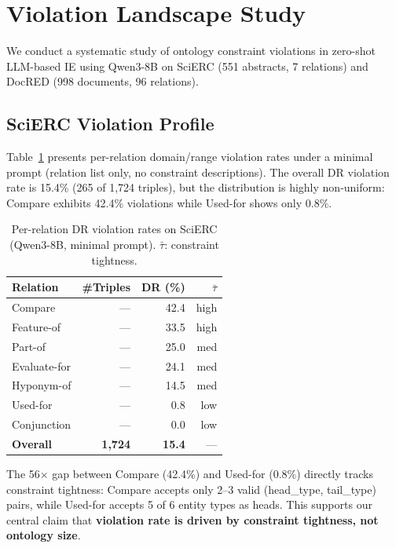 \documentclass[11pt,a4paper]{article}
\begin{document}
\section{Violation Landscape Study}
\label{sec:landscape}

We conduct a systematic study of ontology constraint violations in zero-shot LLM-based IE using Qwen3-8B on SciERC (551 abstracts, 7 relations) and DocRED (998 documents, 96 relations).

\subsection{SciERC Violation Profile}
\label{sec:scierc-violations}

Table~\ref{tab:per-relation-dr} presents per-relation domain/range violation rates under a minimal prompt (relation list only, no constraint descriptions). The overall DR violation rate is 15.4\% (265 of 1,724 triples), but the distribution is highly non-uniform: Compare exhibits 42.4\% violations while Used-for shows only 0.8\%.

\begin{table}[t]
\centering
\small
\caption{Per-relation DR violation rates on SciERC (Qwen3-8B, minimal prompt). $\bar{\tau}$: constraint tightness.}
\label{tab:per-relation-dr}
\begin{tabular}{lrrr}
\toprule
\textbf{Relation} & \textbf{\#Triples} & \textbf{DR (\%)} & \textbf{$\bar{\tau}$} \\
\midrule
Compare & --- & 42.4 & high \\
Feature-of & --- & 33.5 & high \\
Part-of & --- & 25.0 & med \\
Evaluate-for & --- & 24.1 & med \\
Hyponym-of & --- & 14.5 & med \\
Used-for & --- & 0.8 & low \\
Conjunction & --- & 0.0 & low \\
\midrule
\textbf{Overall} & \textbf{1,724} & \textbf{15.4} & --- \\
\bottomrule
\end{tabular}
\end{table}

The 56$\times$ gap between Compare (42.4\%) and Used-for (0.8\%) directly tracks constraint tightness: Compare accepts only 2--3 valid (head\_type, tail\_type) pairs, while Used-for accepts 5 of 6 entity types as heads. This supports our central claim that \textbf{violation rate is driven by constraint tightness, not ontology size}.
\end{document}
